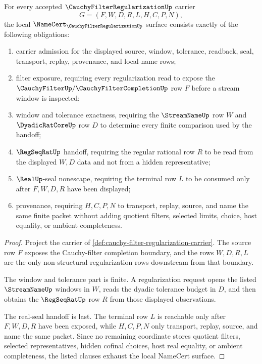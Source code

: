 \begin{theorem}
\label{thm:cauchy-filter-regularization-namecert-obligations}
For every accepted $\CauchyFilterRegularizationUp$ carrier
$$
G=(F,W,D,R,L,H,C,P,N),
$$
the local $\NameCert_{\CauchyFilterRegularizationUp}$ surface consists exactly of the following obligations:
\begin{enumerate}
\item carrier admission for the displayed source, window, tolerance, readback, seal, transport, replay, provenance, and local-name rows;
\item filter exposure, requiring every regularization read to expose the $\CauchyFilterUp/\CauchyFilterCompletionUp$ row $F$ before a stream window is inspected;
\item window and tolerance exactness, requiring the $\StreamNameUp$ row $W$ and $\DyadicRatCoreUp$ row $D$ to determine every finite comparison used by the handoff;
\item $\RegSeqRatUp$ handoff, requiring the regular rational row $R$ to be read from the displayed $W,D$ data and not from a hidden representative;
\item $\RealUp$-seal nonescape, requiring the terminal row $L$ to be consumed only after $F,W,D,R$ have been displayed;
\item provenance, requiring $H,C,P,N$ to transport, replay, source, and name the same finite packet without adding quotient filters, selected limits, choice, host equality, or ambient completeness.
\end{enumerate}
\end{theorem}
\begin{proof}
Project the carrier of \autoref{def:cauchy-filter-regularization-carrier}. The source row $F$ exposes the Cauchy-filter completion boundary, and the rows $W,D,R,L$ are the only non-structural regularization rows downstream from that boundary.

The window and tolerance part is finite. A regularization request opens the listed $\StreamNameUp$ windows in $W$, reads the dyadic tolerance budget in $D$, and then obtains the $\RegSeqRatUp$ row $R$ from those displayed observations.

The real-seal handoff is last. The terminal row $L$ is reachable only after $F,W,D,R$ have been exposed, while $H,C,P,N$ only transport, replay, source, and name the same packet. Since no remaining coordinate stores quotient filters, selected representatives, hidden cofinal choices, host real equality, or ambient completeness, the listed clauses exhaust the local NameCert surface.
\end{proof}


